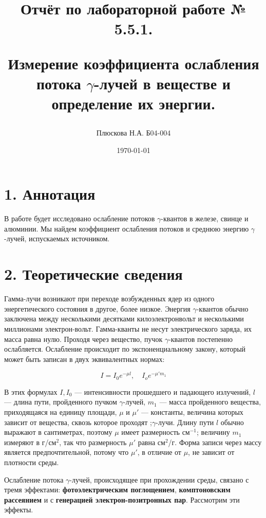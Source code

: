 \documentclass[a4paper,12pt]{report}
\title{Отчёт по лабораторной работе № 5.5.1. 

Измерение коэффициента ослабления потока $\gamma$-лучей в веществе и определение их энергии.}
\author{Плюскова Н.А. Б04-004 }
\date{\today}
\begin{document}
\maketitle
\section*{1. Аннотация}
В работе будет исследовано ослабление потоков $\gamma$-квантов в железе, свинце и алюминии. Мы найдем коэффициент ослабления потоков и среднюю энергию $\gamma$-лучей, испускаемых источником.

\section*{2. Теоретические сведения}
	Гамма-лучи возникают при переходе возбужденных ядер из одного энергетического состояния в другое, более низкое. Энергия $ \gamma $-квантов обычно заключена между несколькими десятками килоэлектронвольт и несколькими миллионами электрон-вольт. Гамма-кванты не несут электрического заряда, их масса равна нулю. Проходя через вещество, пучок $ \gamma $-квантов постепенно ослабляется. Ослабление происходит по экспоненциальному закону, который может быть записан в двух эквивалентных нормах:
	
	\begin{equation}\label{I(mu)}
	I = I_0 e^{-\mu l}, \quad I_o e^{-\mu 'm_1} 
	\end{equation}
	
	В этих формулах $ I, I_0 $ --- интенсивности прошедшего и падающего излучений, $ l $ --- длина пути, пройденного пучком $\gamma$-лучей, $ m_1 $ --- масса пройденного вещества, приходящаяся на единицу площади, $ \mu $ и $ \mu' $ --- константы, величина которых зависит от вещества, сквозь которое проходят ;$\gamma$-лучи. Длину пути $ l $ обычно выражают в сантиметрах, поэтому $ \mu $ имеет размерность см$ ^{-1} $; величину $ m_1 $ измеряют в г/см$ ^2 $, так что размерность $ \mu' $ равна см$ ^2 $/г. Форма записи через массу является предпочтительной, потому что $ \mu' $, в отличие от $ \mu $, не зависит от плотности среды. 
	
	Ослабление потока $\gamma$-лучей, происходящее при прохождении среды, связано с тремя эффектами: \textbf{фотоэлектрическим поглощением}, \textbf{комптоновским рассеянием} и с \textbf{генерацией электрон-позитронных пар}. Рассмотрим эти эффекты.
\end{document}
